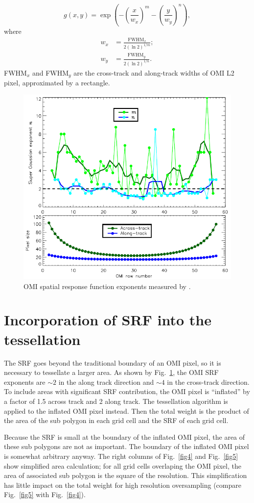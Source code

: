 \documentclass[hidelinks,12pt]{article}
\begin{document}
\begin{equation*}
g(x,y) = \exp \left( -\left( \frac{x}{w_x}\right)^m -\left( \frac{y}{w_y}\right)^n\right),
\end{equation*}
where
\begin{align*}
w_x & = \frac{\text{FWHM}_x}{2(\ln 2)^{1/m}};\\
w_y & = \frac{\text{FWHM}_y}{2(\ln 2)^{1/n}}.
\end{align*}
FWHM$_x$ and FWHM$_y$ are the cross-track and along-track widths of OMI L2 pixel, approximated by a rectangle.
 \begin{figure}[hbtp]
 \centering
 \includegraphics[width=.5\linewidth]{../plot/amt_fig9.png}
 \caption{OMI spatial response function exponents measured by \citet{graaf2016how}.}
 \label{fig3}
 \end{figure}

\section{Incorporation of SRF into the tessellation}
The SRF goes beyond the traditional boundary of an OMI pixel, so it is necessary to tessellate a larger area. As shown by Fig.~\ref{fig3}, the OMI SRF exponents are $\sim2$ in the along track direction and $\sim4$ in the cross-track direction. To include areas with significant SRF contribution, the OMI pixel is ``inflated'' by a factor of 1.5 across track and 2 along track. The tessellation algorithm is applied to the inflated OMI pixel instead. Then the total weight is the product of the area of the sub polygon in each grid cell and the SRF of each grid cell.

Because the SRF is small at the boundary of the inflated OMI pixel, the area of these sub polygons are not as important. The boundary of the inflated OMI pixel is somewhat arbitrary anyway. The right columns of Fig.~\ref{fig4} and Fig.~\ref{fig5} show simplified area calculation; for all grid cells overlaping the OMI pixel, the area of associated sub polygon is the square of the resolution. This simplification has little impact on the total weight for high resolution oversampling (compare Fig.~\ref{fig5} with Fig.~\ref{fig4}).
\end{document}
